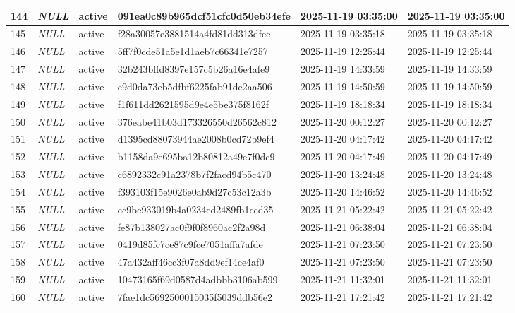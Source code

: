 \begin{longtable}{|l|l|l|l|l|l|}
144 & \textit{NULL} & active & 091ea0c89b965dcf51cfc0d50eb34efe & 2025-11-19 03:35:00 & 2025-11-19 03:35:00 \\ \hline 
145 & \textit{NULL} & active & f28a30057e3881514a4fd81dd313dfee & 2025-11-19 03:35:18 & 2025-11-19 03:35:18 \\ \hline 
146 & \textit{NULL} & active & 5ff7f0cde51a5e1d1aeb7c66341e7257 & 2025-11-19 12:25:44 & 2025-11-19 12:25:44 \\ \hline 
147 & \textit{NULL} & active & 32b243bffd8397e157c5b26a16e4afe9 & 2025-11-19 14:33:59 & 2025-11-19 14:33:59 \\ \hline 
148 & \textit{NULL} & active & e9d0da73eb5dfbf6225fab91de2aa506 & 2025-11-19 14:50:59 & 2025-11-19 14:50:59 \\ \hline 
149 & \textit{NULL} & active & f1f611dd2621595d9e4e5be375f8162f & 2025-11-19 18:18:34 & 2025-11-19 18:18:34 \\ \hline 
150 & \textit{NULL} & active & 376eabe41b03d173326550d26562c812 & 2025-11-20 00:12:27 & 2025-11-20 00:12:27 \\ \hline 
151 & \textit{NULL} & active & d1395cd88073944ae2008b0cd72b9ef4 & 2025-11-20 04:17:42 & 2025-11-20 04:17:42 \\ \hline 
152 & \textit{NULL} & active & b1158da9e695ba12b80812a49e7f0dc9 & 2025-11-20 04:17:49 & 2025-11-20 04:17:49 \\ \hline 
153 & \textit{NULL} & active & c6892332c91a2378b7f2facd94b5c470 & 2025-11-20 13:24:48 & 2025-11-20 13:24:48 \\ \hline 
154 & \textit{NULL} & active & f393103f15e9026e0ab9d27c53c12a3b & 2025-11-20 14:46:52 & 2025-11-20 14:46:52 \\ \hline 
155 & \textit{NULL} & active & ec9be933019b4a0234cd2489fb1ccd35 & 2025-11-21 05:22:42 & 2025-11-21 05:22:42 \\ \hline 
156 & \textit{NULL} & active & fe87b138027ac0f9f0f8960ac2f2a98d & 2025-11-21 06:38:04 & 2025-11-21 06:38:04 \\ \hline 
157 & \textit{NULL} & active & 0419d85fc7ce87c9fce7051affa7afde & 2025-11-21 07:23:50 & 2025-11-21 07:23:50 \\ \hline 
158 & \textit{NULL} & active & 47a432aff46cc3f07a8dd9ef14ce4af0 & 2025-11-21 07:23:50 & 2025-11-21 07:23:50 \\ \hline 
159 & \textit{NULL} & active & 10473165f69d0587d4adbbb3106ab599 & 2025-11-21 11:32:01 & 2025-11-21 11:32:01 \\ \hline 
160 & \textit{NULL} & active & 7fae1dc5692500015035f5039ddb56e2 & 2025-11-21 17:21:42 & 2025-11-21 17:21:42 \\ \hline 

\end{longtable}
